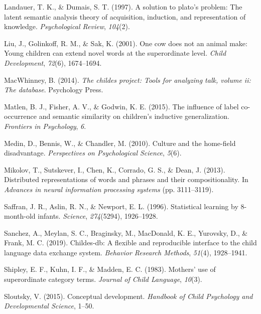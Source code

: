 \documentclass[english,,man,floatsintext]{apa6}
\begin{document}
\leavevmode\hypertarget{ref-landauer1997}{}%
Landauer, T. K., \& Dumais, S. T. (1997). A solution to plato's problem: The latent semantic analysis theory of acquisition, induction, and representation of knowledge. \emph{Psychological Review}, \emph{104}(2).

\leavevmode\hypertarget{ref-liu2001}{}%
Liu, J., Golinkoff, R. M., \& Sak, K. (2001). One cow does not an animal make: Young children can extend novel words at the superordinate level. \emph{Child Development}, \emph{72}(6), 1674--1694.

\leavevmode\hypertarget{ref-macwhinney2014}{}%
MacWhinney, B. (2014). \emph{The childes project: Tools for analyzing talk, volume ii: The database}. Psychology Press.

\leavevmode\hypertarget{ref-matlen2015}{}%
Matlen, B. J., Fisher, A. V., \& Godwin, K. E. (2015). The influence of label co-occurrence and semantic similarity on children's inductive generalization. \emph{Frontiers in Psychology}, \emph{6}.

\leavevmode\hypertarget{ref-medin2010}{}%
Medin, D., Bennis, W., \& Chandler, M. (2010). Culture and the home-field disadvantage. \emph{Perspectives on Psychological Science}, \emph{5}(6).

\leavevmode\hypertarget{ref-mikolov2013}{}%
Mikolov, T., Sutskever, I., Chen, K., Corrado, G. S., \& Dean, J. (2013). Distributed representations of words and phrases and their compositionality. In \emph{Advances in neural information processing systems} (pp. 3111--3119).

\leavevmode\hypertarget{ref-saffran1996}{}%
Saffran, J. R., Aslin, R. N., \& Newport, E. L. (1996). Statistical learning by 8-month-old infants. \emph{Science}, \emph{274}(5294), 1926--1928.

\leavevmode\hypertarget{ref-sanchez2019}{}%
Sanchez, A., Meylan, S. C., Braginsky, M., MacDonald, K. E., Yurovsky, D., \& Frank, M. C. (2019). Childes-db: A flexible and reproducible interface to the child language data exchange system. \emph{Behavior Research Methods}, \emph{51}(4), 1928--1941.

\leavevmode\hypertarget{ref-shipley1983}{}%
Shipley, E. F., Kuhn, I. F., \& Madden, E. C. (1983). Mothers' use of superordinate category terms. \emph{Journal of Child Language}, \emph{10}(3).

\leavevmode\hypertarget{ref-sloutsky2015}{}%
Sloutsky, V. (2015). Conceptual development. \emph{Handbook of Child Psychology and Developmental Science}, 1--50.
\end{document}
